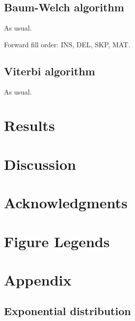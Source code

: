 \documentclass[10pt]{article}
\begin{document}
\subsection{Baum-Welch algorithm}

As usual.

Forward fill order: INS, DEL, SKP, MAT.

\subsection{Viterbi algorithm}

As usual.


\newpage
\section{Results}




\section{Discussion}


\newpage
\section{Acknowledgments}



\clearpage
\section{Figure Legends}

\clearpage
\section{Appendix}

\subsection{Exponential distribution}
\end{document}
